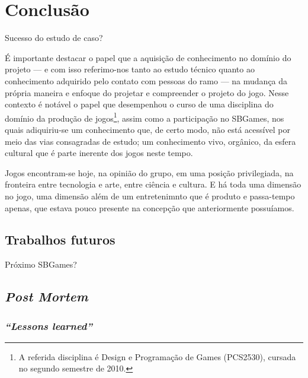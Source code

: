 \chapter{Conclusão}

Sucesso do estudo de caso?


É importante destacar o papel que a aquisição de conhecimento no
domínio do projeto --- e com isso referimo-nos tanto ao estudo técnico
quanto ao conhecimento adquirido pelo contato com pessoas do ramo ---
na mudança da própria maneira e enfoque do projetar e compreender o
projeto do jogo. Nesse contexto é notável o papel que desempenhou o
curso de uma disciplina do domínio da produção de
jogos\footnote{A referida disciplina é Design e Programação de Games
  (\textsc{PCS2530}), cursada no segundo semestre de 2010.}, assim
como a participação no SBGames, nos quais adiquiriu-se um conhecimento
que, de certo modo, não está acessível por meio das vias consagradas
de estudo; um conhecimento vivo, orgânico, da esfera cultural que é
parte inerente dos jogos neste tempo.

Jogos encontram-se hoje, na opinião do grupo, em uma posição
privilegiada, na fronteira entre tecnologia e arte, entre ciência e
cultura. E há toda uma dimensão no jogo, uma dimensão além de um
entretenimnto que é produto e passa-tempo apenas, que estava pouco
presente na concepção que anteriormente possuíamos.

\section{Trabalhos futuros}

Próximo SBGames?

\section{\emph{Post Mortem}}

\subsection{\emph{``Lessons learned''}}

